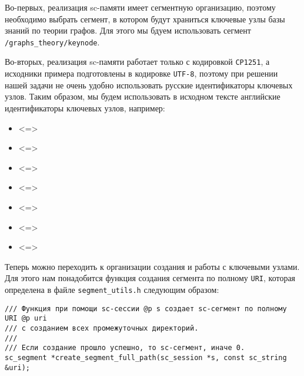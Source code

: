 Во-первых, реализация sc-памяти имеет сегментную организацию, поэтому
необходимо выбрать сегмент, в котором будут храниться ключевые узлы
базы знаний по теории графов. Для этого мы бдуем использовать сегмент
\verb|/graphs_theory/keynode|.

Во-вторых, реализация sc-памяти работает только с кодировкой
\verb|CP1251|, а исходники примера подготовлены в кодировке
\verb|UTF-8|, поэтому при решении нашей задачи не очень удобно
использовать русские идентификаторы ключевых узлов. Таким образом, мы
будем использовать в исходном тексте английские идентификаторы
ключевых узлов, например:
\begin{itemize}
\item {} <=> 
\item {} <=> 
\item {} <=> 
\item {} <=> 
\item {} <=> 
\item {} <=> 
\item {} <=> 
\end{itemize}

Теперь можно переходить к организации создания и работы с ключевыми
узлами. Для этого нам понадобится функция создания сегмента по полному
\verb|URI|, которая определена в файле \verb|segment_utils.h|
следующим образом:
\begin{lstlisting}[texcl]
/// Функция при помощи sc-сессии @p s создает sc-сегмент по полному URI @p uri
/// c созданием всех промежуточных директорий.
///
/// Если создание прошло успешно, то sc-сегмент, иначе 0.
sc_segment *create_segment_full_path(sc_session *s, const sc_string &uri);
\end{lstlisting}

